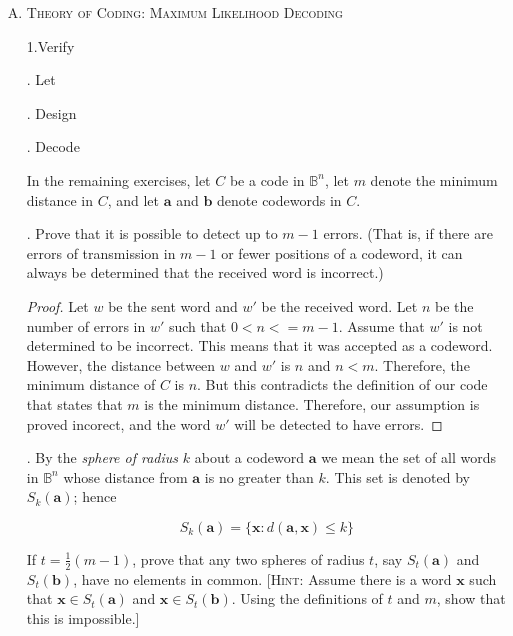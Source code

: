 \documentclass[twoside]{amsart}
\begin{document}
\begin{enumerate}[A.]
   \item \textsc{Theory of Coding: Maximum Likelihood Decoding}

      \noindent 1.Verify
      
      . Let
      
      . Design
      
      . Decode

      In the remaining exercises, let $C$ be a code in $\mathbb{B}^n$,
      let $m$ denote the minimum distance in $C$, and let 
      $\mathbf{a}$ and $\mathbf{b}$ denote codewords in $C$.

      . Prove that it is possible to detect up to $m-1$ errors.
      (That is, if there are errors of transmission in $m-1$ or 
      fewer positions of a codeword, it can always be determined
      that the received word is incorrect.)

      \begin{proof}
	 Let $w$ be the sent word and $w'$ be the received word. Let 
	 $n$ be the number of errors in $w'$ such that $0 < n <= m - 1$. 
	 Assume that $w'$ is not determined to be incorrect. This means
	 that it was accepted as a codeword. However, the distance
	 between $w$ and $w'$ is $n$ and $n < m$. Therefore, the 
	 minimum distance of $C$ is $n$. But this contradicts
	 the definition of our code that states that $m$ is the minimum
	 distance. Therefore, our assumption is proved incorect, and
	 the word $w'$ will be detected to have errors.
      \end{proof}

      . By the \emph{sphere of radius} $k$ about a codeword
      $\mathbf{a}$ we mean the set of all words in $\mathbb{B}^n$
      whose distance from $\mathbf{a}$ is no greater than $k$. This set
      is denoted by $S_k(\mathbf{a})$; hence 
      \begin{center}
      $$ S_k(\mathbf{a}) = \{\mathbf{x} : d(\mathbf{a},\mathbf{x}) \le k \}$$
      \end{center}

      If $t=\frac{1}{2}(m-1)$, prove that any two spheres of radius $t$,
      say $S_t(\mathbf{a})$ and $S_t(\mathbf{b})$, have no elements in
      common. [\textsc{Hint}: Assume there is a word $\mathbf{x}$ such
      that $\mathbf{x} \in S_t(\mathbf{a})$ and $\mathbf{x}\in S_t(
      \mathbf{b})$. Using the definitions of $t$ and $m$, show that
      this is impossible.]


\end{enumerate}
\end{document}
